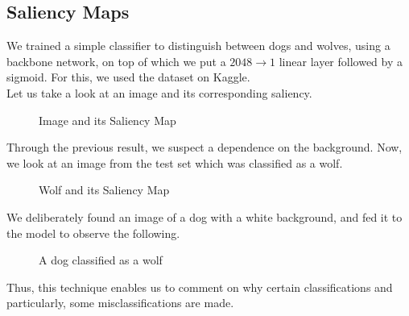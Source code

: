 \subsection{Saliency Maps}
We trained a simple classifier to distinguish between dogs and wolves, using a \cite{ResNet} backbone network, on top of which we put a $2048 \to 1$ linear layer followed by a sigmoid. For this, we used the \cite{dogvwolf} dataset on Kaggle. \\ Let us take a look at an image and its corresponding saliency.
\begin{figure}[H]
    \centering
    \qquad
    \caption[Short text]{Image and its Saliency Map}
\end{figure}
Through the previous result, we suspect a dependence on the background. Now, we look at an image from the test set which was classified as a wolf.
\begin{figure}[H]
    \centering
    \qquad
    \caption[Short text]{Wolf  and its Saliency Map}
\end{figure}
We deliberately found an image of a dog with a white background, and fed it to the model to observe the following.
\begin{figure}[H]
    \centering
    \qquad
    \caption[Short text]{A dog classified as a wolf}
\end{figure}
Thus, this technique enables us to comment on why certain classifications and particularly, some misclassifications are made.